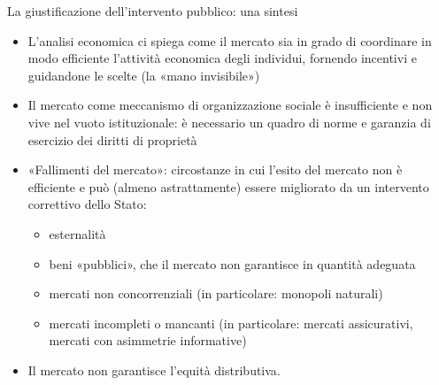 \documentclass[aspectratio=64,11pt]{beamer}
\begin{document}
\begin{frame}{La giustificazione dell'intervento pubblico: una sintesi}
\begin{itemize}
\item L'analisi economica ci spiega come il mercato sia in grado di coordinare in
modo efficiente l'attività economica degli individui, fornendo incentivi e
guidandone le scelte (la «mano invisibile»)
\item Il mercato come meccanismo di organizzazione sociale è insufficiente e non
vive nel vuoto istituzionale: è necessario un quadro di norme e garanzia di
esercizio dei diritti di proprietà
\item \alert{«Fallimenti del mercato»}: circostanze in cui l'esito del mercato non è
efficiente e può (almeno astrattamente) essere migliorato da un intervento
correttivo dello Stato:
\begin{itemize}
\item esternalità
\item beni «pubblici», che il mercato non garantisce in quantità adeguata
\item mercati non concorrenziali (in particolare: monopoli naturali)
\item mercati incompleti o mancanti (in particolare: mercati assicurativi,
mercati con asimmetrie informative)
\end{itemize}
\item Il mercato non garantisce l'\alert{equità distributiva}.
\end{itemize}
\end{frame}
\end{document}
